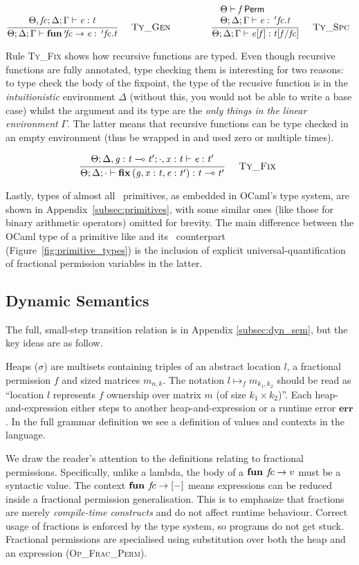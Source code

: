 \vspace{-\baselineskip}
\[
    {\displaystyle\frac{\begin{array}{l} \Theta , \mathit{fc} ; \Delta ; \Gamma \vdash \mathit{e} : \mathit{t} \\ \end{array}}{ \Theta ; \Delta ; \Gamma \vdash \mathbf{fun} {\: '\! \mathit{fc} } \rightarrow \mathit{e} : \: '\! \, \mathit{fc} . \mathit{t}}\quad\textsc{ {\textsc{Ty\_Gen}}{} }} \qquad\qquad {\displaystyle\frac{\begin{array}{l}  \Theta \vdash \mathit{f} \, \textsf{Perm} \\  \Theta ; \Delta ; \Gamma \vdash \mathit{e} : \: '\! \, \mathit{fc} . \mathit{t} \\ \end{array}}{ \Theta ; \Delta ; \Gamma \vdash \mathit{e} [ \mathit{f} ] : \mathit{t} [ \mathit{f} / \mathit{fc} ]}\quad\textsc{ {\textsc{Ty\_Spc}}{} }}
\]

Rule \textsc{Ty\_Fix} shows how recursive functions are typed. Even though
recursive functions are fully annotated, type checking them is interesting for
two reasons: to type check the body of the fixpoint, the type of the recusive
function is in the \emph{intuitionistic} environment $\Delta$ (without this,
you would not be able to write a base case) whilst the argument and its type
are the \emph{only things in the linear environment} $\Gamma$. The latter means
that recursive functions can be type checked in an empty environment (thus be
wrapped in  and used zero or multiple times).

\vspace{-\baselineskip}
\[
    {\displaystyle\frac{\begin{array}{l} \Theta ; \Delta , \mathit{g} : \mathit{t} \multimap \mathit{t'} ; \cdot , \mathit{x} : \mathit{t} \vdash \mathit{e} : \mathit{t'} \\ \end{array}}{ \Theta ; \Delta ; \cdot \vdash \mathbf{fix} \, ( \mathit{g} , \mathit{x} : \mathit{t} , \mathit{e} : \mathit{t'} ) : \mathit{t} \multimap \mathit{t'}}\quad\textsc{ {\textsc{Ty\_Fix}}{} }}
\]

Lastly, types of almost all \lang\ primitives, as embedded in OCaml's type
system, are shown in Appendix~\ref{subsec:primitives}, with some similar ones
(like those for binary arithmetic operators) omitted for brevity. The main
difference between the OCaml type of a primitive like  and its
\lang\ counterpart (Figure~\ref{fig:primitive_types}) is the inclusion of
explicit universal-quantification of fractional permission variables in the
latter.

\subsection{Dynamic Semantics}\label{subsec:semantics}

The full, small-step transition relation is in Appendix \ref{subsec:dyn_sem},
but the key ideas are as follow.

Heaps ($\sigma$) are multisets containing triples of an abstract location $l$,
a fractional permission $f$ and sized matrices $m_{n,k}$. The notation $l
\mapsto_f m_{k_1, k_2}$ should be read as ``location $l$ represents $f$
ownership over matrix $m$ (of size $k_1 \times k_2$)''.  Each heap-and-expression
either steps to another heap-and-expression or a runtime error $\mathbf{err}$.
In the full grammar definition we see a definition of values and contexts in
the language.

We draw the reader's attention to the definitions relating to fractional
permissions. Specifically, unlike a lambda, the body of a $\mathbf{fun}\ f\!c
\rightarrow v$ must be a syntactic value. The context $\mathbf{fun}\ f\!c
\rightarrow [-]$ means expressions can be reduced inside a fractional
permission generalisation. This is to emphasize that fractions are merely
\emph{compile-time constructs} and do not affect runtime behaviour. Correct
usage of fractions is enforced by the type system, so programs do not get
stuck. Fractional permissions are specialised using substitution over both the
heap and an expression (\textsc{Op\_Frac\_Perm}).

